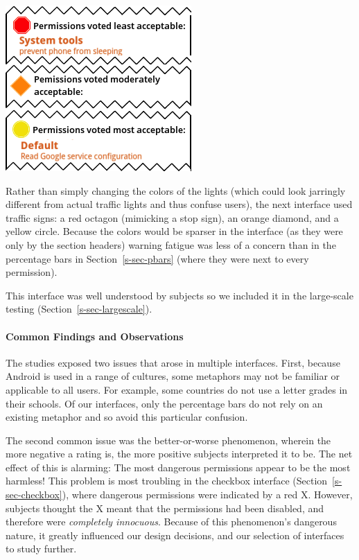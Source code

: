 \documentclass[11pt]{article}
\newcommand{\refsec}[1]{Section~\ref{#1}}
\begin{document}
\label{ss-sec-traffic-r4}
\begin{center}
\includegraphics[width=.5\linewidth]{candidate-img/traffic/trafficR4.png}
\end{center}

Rather than simply changing the colors of
the lights (which  
could look jarringly different from actual traffic lights and thus confuse users), 
the next interface used traffic signs: a red octagon
(mimicking a stop sign), an orange diamond, and a yellow circle. 
Because the colors would be sparser in the interface (as they were only by the section 
headers) warning fatigue was less of
a concern than in the percentage bars in \refsec{s-sec-pbars} 
(where they were next to every permission). 

This interface was well understood by subjects so we included it
in the large-scale testing (\refsec{s-sec-largescale}).


\paragraph{Common Findings and Observations}
\label{common-findings}

The studies exposed two issues that arose in multiple 
interfaces. First, because Android is used in a range of 
cultures, some metaphors may not be familiar or applicable to all users.
For example, some countries 
do not use a letter grades in their schools.
Of our
interfaces, only the percentage bars do 
not rely on an existing metaphor and so avoid this particular confusion.

The second common issue was the better-or-worse phenomenon, 
wherein the more negative a rating is, the more positive subjects interpreted 
it to be. The net effect of this is alarming: The most dangerous permissions 
appear to be the most harmless! This problem is 
most troubling in the checkbox interface (\refsec{s-sec-checkbox}),
where dangerous permissions were indicated by a red X. However, 
subjects thought the X meant that the permissions had been disabled, and therefore 
were \emph{completely innocuous}. Because of this phenomenon's dangerous nature, it greatly 
influenced our design decisions, and our selection of interfaces to study further.
\end{document}
